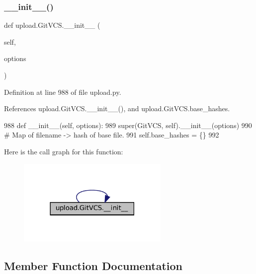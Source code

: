 \subsubsection{\texorpdfstring{\+\_\+\+\_\+init\+\_\+\+\_\+()}{\_\_init\_\_()}\hspace{0.1cm}{\footnotesize\ttfamily [2/2]}}
{\footnotesize\ttfamily def upload.\+Git\+V\+C\+S.\+\_\+\+\_\+init\+\_\+\+\_\+ (\begin{DoxyParamCaption}\item[{}]{self,  }\item[{}]{options }\end{DoxyParamCaption})}



Definition at line 988 of file upload.\+py.



References upload.\+Git\+V\+C\+S.\+\_\+\+\_\+init\+\_\+\+\_\+(), and upload.\+Git\+V\+C\+S.\+base\+\_\+hashes.


\begin{DoxyCode}
988   \textcolor{keyword}{def }\_\_init\_\_(self, options):
989     super(GitVCS, self).\_\_init\_\_(options)
990     \textcolor{comment}{# Map of filename -> hash of base file.}
991     self.base\_hashes = \{\}
992 
\end{DoxyCode}
Here is the call graph for this function\+:
\nopagebreak
\begin{figure}[H]
\begin{center}
\leavevmode
\includegraphics[width=206pt]{classupload_1_1GitVCS_aba4e1dca1c4b3e5db7ba07f6bce3c839_cgraph}
\end{center}
\end{figure}


\subsection{Member Function Documentation}
\mbox{\label{classupload_1_1GitVCS_a3ebfc01cebc9b585706ad3f4389a8833}} 
